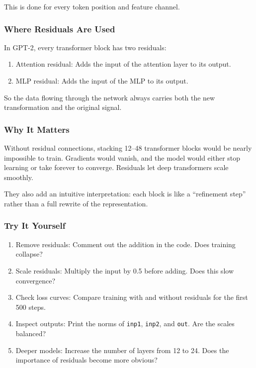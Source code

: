 \documentclass[
  letterpaper,
  DIV=11,
  numbers=noendperiod]{scrreprt}
\providecommand{\tightlist}{%
  \setlength{\itemsep}{0pt}\setlength{\parskip}{0pt}}
\begin{document}
This is done for every token position and feature channel.

\subsubsection{Where Residuals Are Used}\label{where-residuals-are-used}

In GPT-2, every transformer block has two residuals:

\begin{enumerate}
\def\labelenumi{\arabic{enumi}.}
\tightlist
\item
  Attention residual: Adds the input of the attention layer to its
  output.
\item
  MLP residual: Adds the input of the MLP to its output.
\end{enumerate}

So the data flowing through the network always carries both the new
transformation and the original signal.

\subsubsection{Why It Matters}\label{why-it-matters-14}

Without residual connections, stacking 12--48 transformer blocks would
be nearly impossible to train. Gradients would vanish, and the model
would either stop learning or take forever to converge. Residuals let
deep transformers scale smoothly.

They also add an intuitive interpretation: each block is like a
``refinement step'' rather than a full rewrite of the representation.

\subsubsection{Try It Yourself}\label{try-it-yourself-16}

\begin{enumerate}
\def\labelenumi{\arabic{enumi}.}
\tightlist
\item
  Remove residuals: Comment out the addition in the code. Does training
  collapse?
\item
  Scale residuals: Multiply the input by 0.5 before adding. Does this
  slow convergence?
\item
  Check loss curves: Compare training with and without residuals for the
  first 500 steps.
\item
  Inspect outputs: Print the norms of \texttt{inp1}, \texttt{inp2}, and
  \texttt{out}. Are the scales balanced?
\item
  Deeper models: Increase the number of layers from 12 to 24. Does the
  importance of residuals become more obvious?
\end{enumerate}
\end{document}
